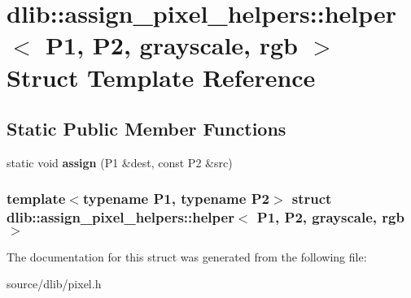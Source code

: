 \hypertarget{structdlib_1_1assign__pixel__helpers_1_1helper_3_01P1_00_01P2_00_01grayscale_00_01rgb_01_4}{
\section{dlib::assign\_\-pixel\_\-helpers::helper$<$ P1, P2, grayscale, rgb $>$ Struct Template Reference}
\label{structdlib_1_1assign__pixel__helpers_1_1helper_3_01P1_00_01P2_00_01grayscale_00_01rgb_01_4}
}
\subsection*{Static Public Member Functions}
\begin{DoxyCompactItemize}
\item 
\hypertarget{structdlib_1_1assign__pixel__helpers_1_1helper_3_01P1_00_01P2_00_01grayscale_00_01rgb_01_4_a39a319abdeb5ff8a749d493c2e2e025b}{
static void {\bfseries assign} (P1 \&dest, const P2 \&src)}
\label{structdlib_1_1assign__pixel__helpers_1_1helper_3_01P1_00_01P2_00_01grayscale_00_01rgb_01_4_a39a319abdeb5ff8a749d493c2e2e025b}

\end{DoxyCompactItemize}
\subsubsection*{template$<$typename P1, typename P2$>$ struct dlib::assign\_\-pixel\_\-helpers::helper$<$ P1, P2, grayscale, rgb $>$}



The documentation for this struct was generated from the following file:\begin{DoxyCompactItemize}
\item 
source/dlib/pixel.h\end{DoxyCompactItemize}
